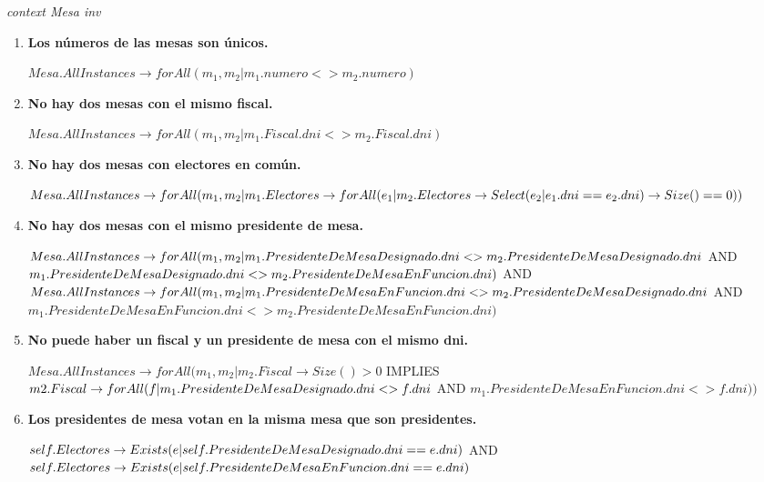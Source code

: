 \textit{context Mesa
inv}
\begin{enumerate}

\item \textbf{Los n\'umeros de las mesas son únicos.}

$Mesa.AllInstances \rightarrow forAll(m_1, m_2 | m_1.numero <> m_2.numero)$

\item  \textbf{No hay dos mesas con el mismo fiscal.}

$Mesa.AllInstances \rightarrow forAll(m_1, m_2 | m_1.Fiscal.dni <> m_2.Fiscal.dni)$

\item \textbf{No hay dos mesas con electores en común.}

$Mesa.AllInstances \rightarrow \\
 forAll(m_1, m_2 | m_1.Electores \rightarrow \\
 forAll(e_1 | m_2.Electores \rightarrow Select(e_2 | e_1.dni==e_2.dni) \rightarrow Size() == 0))$

\item \textbf{No hay dos mesas con el mismo presidente de mesa.}

$Mesa.AllInstances \rightarrow \\
forAll(m_1, m_2 | m_1.PresidenteDeMesaDesignado.dni <> m_2.PresidenteDeMesaDesignado.dni $ AND $ 
m_1.PresidenteDeMesaDesignado.dni <> m_2.PresidenteDeMesaEnFuncion.dni ) \\ $
 AND $\\
 Mesa.AllInstances \rightarrow \\
forAll(m_1, m_2 | m_1.PresidenteDeMesaEnFuncion.dni <> m_2.PresidenteDeMesaDesignado.dni $ AND $ 
m_1.PresidenteDeMesaEnFuncion.dni <> m_2.PresidenteDeMesaEnFuncion.dni ) $

\item \textbf{No puede haber un fiscal y un presidente de mesa con el mismo dni.}

$ Mesa.AllInstances \rightarrow forAll(m_1, m_2 | m_2.Fiscal \rightarrow Size() > 0 $ IMPLIES $  m2.Fiscal \rightarrow \\ 
forAll( f | m_1.PresidenteDeMesaDesignado.dni<>f.dni $ AND $ m_1.PresidenteDeMesaEnFuncion.dni<>f.dni))$

\item \textbf{Los presidentes de mesa votan en la misma mesa que son presidentes.}

$self.Electores \rightarrow Exists(e | self.PresidenteDeMesaDesignado.dni == e.dni) \\ $
 AND $ \\
 self.Electores \rightarrow Exists(e | self.PresidenteDeMesaEnFuncion.dni == e.dni) $


\end{enumerate}
